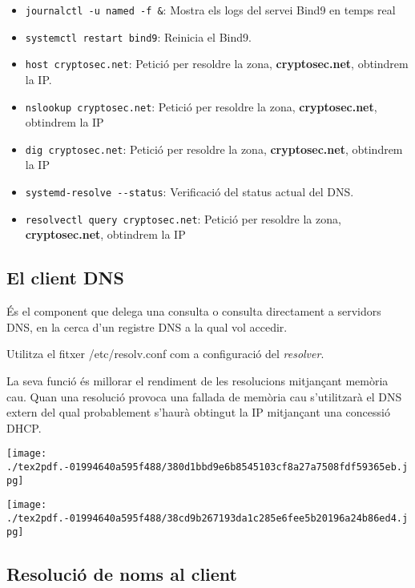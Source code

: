 \documentclass[]{article}
\begin{document}
\begin{itemize}
\item
  \texttt{journalctl\ -u\ named\ -f\ \&}: Mostra els logs del servei
  Bind9 en temps real
\item
  \texttt{systemctl\ restart\ bind9}: Reinicia el Bind9.
\item
  \texttt{host\ cryptosec.net}: Petició per resoldre la zona,
  \textbf{cryptosec.net}, obtindrem la IP.
\item
  \texttt{nslookup\ cryptosec.net}: Petició per resoldre la zona,
  \textbf{cryptosec.net}, obtindrem la IP
\item
  \texttt{dig\ cryptosec.net}: Petició per resoldre la zona,
  \textbf{cryptosec.net}, obtindrem la IP
\item
  \texttt{systemd-resolve\ -\/-status}: Verificació del status actual
  del DNS.
\item
  \texttt{resolvectl\ query\ cryptosec.net}: Petició per resoldre la
  zona, \textbf{cryptosec.net}, obtindrem la IP
\end{itemize}

\hypertarget{el-client-dns}{%
\subsection{\texorpdfstring{\textbf{El client
DNS}}{El client DNS}}\label{el-client-dns}}

És el component que delega una consulta o consulta directament a
servidors DNS, en la cerca d'un registre DNS a la qual vol accedir.

Utilitza el fitxer /etc/resolv.conf com a configuració del
\emph{resolver}.

La seva funció és millorar el rendiment de les resolucions mitjançant
memòria cau. Quan una resolució provoca una fallada de memòria cau
s'utilitzarà el DNS extern del qual probablement s'haurà obtingut la IP
mitjançant una concessió DHCP.

\texttt{[image: ./tex2pdf.-01994640a595f488/380d1bbd9e6b8545103cf8a27a7508fdf59365eb.jpg]}

\texttt{[image: ./tex2pdf.-01994640a595f488/38cd9b267193da1c285e6fee5b20196a24b86ed4.jpg]}

\hypertarget{resoluciuxf3-de-noms-al-client}{%
\subsection{\texorpdfstring{\textbf{Resolució de noms al
client}}{Resolució de noms al client}}\label{resoluciuxf3-de-noms-al-client}}
\end{document}
